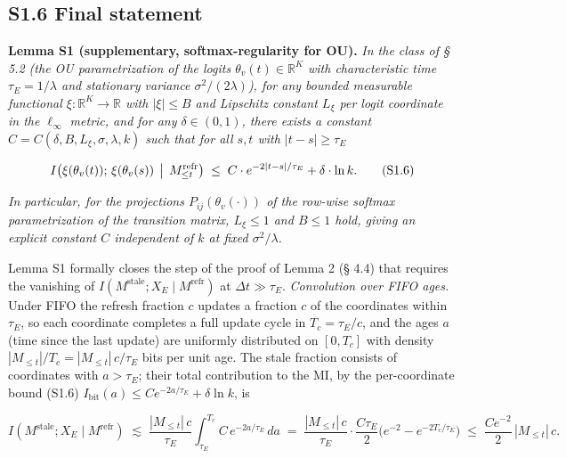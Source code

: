 \documentclass[pdflatex,sn-mathphys-ay]{sn-jnl}
\begin{document}
\subsection*{S1.6 Final statement}\label{s1.6-final-statement}



\textbf{Lemma S1 (supplementary, softmax-regularity for OU).} \emph{In the class of § 5.2 (the OU parametrization of the logits \(\theta_v(t) \in \mathbb{R}^K\) with characteristic time \(\tau_E = 1/\lambda\) and stationary variance \(\sigma^2/(2\lambda)\)), for any bounded measurable functional \(\xi: \mathbb{R}^K \to \mathbb{R}\) with \(|\xi| \le B\) and Lipschitz constant \(L_\xi\) per logit coordinate in the \(\ell_\infty\) metric, and for any \(\delta \in (0, 1)\), there exists a constant \(C = C(\delta, B, L_\xi, \sigma, \lambda, k)\) such that for all \(s, t\) with \(|t-s| \ge \tau_E\)}



\begin{equation}I\bigl(\xi(\theta_v(t));\, \xi(\theta_v(s)) \,\bigm|\, M_{\le t}^{\text{refr}}\bigr) \;\le\; C \cdot e^{-2|t-s|/\tau_E} + \delta \cdot \ln k. \tag{S1.6}\end{equation}



\emph{In particular, for the projections \(P_{ij}(\theta_v(\cdot))\) of the row-wise softmax parametrization of the transition matrix, \(L_\xi \le 1\) and \(B \le 1\) hold, giving an explicit constant \(C\) independent of \(k\) at fixed \(\sigma^2/\lambda\).}



Lemma S1 formally closes the step of the proof of Lemma 2 (§ 4.4) that requires the vanishing of \(I(M^{\text{stale}}; X_E \mid M^{\text{refr}})\) at \(\Delta t \gg \tau_E\). \emph{Convolution over FIFO ages.} Under FIFO the refresh fraction \(c\) updates a fraction \(c\) of the coordinates within \(\tau_E\), so each coordinate completes a full update cycle in \(T_c = \tau_E/c\), and the ages \(a\) (time since the last update) are uniformly distributed on \([0, T_c]\) with density \(|M_{\le t}|/T_c = |M_{\le t}|\,c/\tau_E\) bits per unit age. The stale fraction consists of coordinates with \(a > \tau_E\); their total contribution to the MI, by the per-coordinate bound (S1.6) \(I_{\text{bit}}(a) \le C e^{-2a/\tau_E} + \delta\ln k\), is



\[I(M^{\text{stale}}; X_E \mid M^{\text{refr}}) \;\lesssim\; \frac{|M_{\le t}|\,c}{\tau_E}\int_{\tau_E}^{T_c} C\,e^{-2a/\tau_E}\,da \;=\; \frac{|M_{\le t}|\,c}{\tau_E}\cdot\frac{C\tau_E}{2}\bigl(e^{-2}-e^{-2T_c/\tau_E}\bigr) \;\le\; \frac{C e^{-2}}{2}\,|M_{\le t}|\,c.\]
\end{document}
